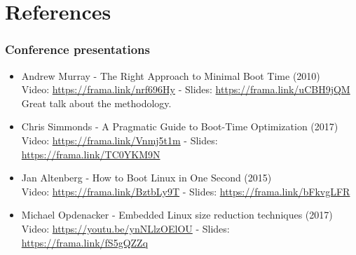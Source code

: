 \section{References}

\begin{frame}
\frametitle{Conference presentations}
\begin{itemize}
\item Andrew Murray - The Right Approach to Minimal Boot Time (2010) \\
      Video: \url{https://frama.link/nrf696Hy} - Slides: \url{https://frama.link/uCBH9jQM} \\
      Great talk about the methodology.
\item Chris Simmonds - A Pragmatic Guide to Boot-Time Optimization (2017)\\
      Video: \url{https://frama.link/Vnmj5t1m} - Slides: \url{https://frama.link/TC0YKM9N}
\item Jan Altenberg - How to Boot Linux in One Second (2015)\\
      Video: \url{https://frama.link/BztbLy9T} - Slides: \url{https://frama.link/bFkvgLFR}
\item Michael Opdenacker - Embedded Linux size reduction techniques (2017)
      Video: \url{https://youtu.be/ynNLlzOElOU} - Slides: \url{https://frama.link/fS5gQZZq}
\end{itemize}
\end{frame}
